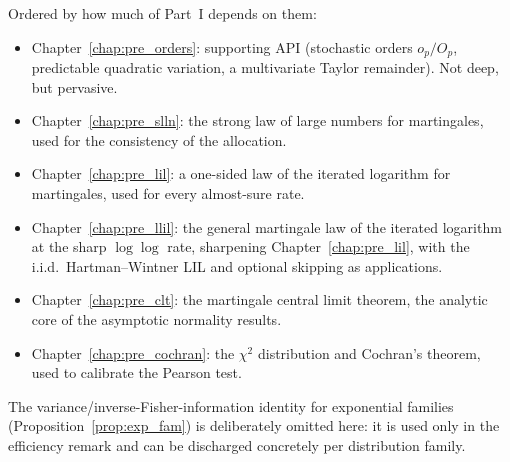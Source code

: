 Ordered by how much of Part~I depends on them:
\begin{itemize}
  \item Chapter~\ref{chap:pre_orders}: supporting API (stochastic orders
        $o_p/O_p$, predictable quadratic variation, a multivariate Taylor
        remainder). Not deep, but pervasive.
  \item Chapter~\ref{chap:pre_slln}: the strong law of large numbers for
        martingales, used for the consistency of the allocation.
  \item Chapter~\ref{chap:pre_lil}: a one-sided law of the iterated logarithm for
        martingales, used for every almost-sure rate.
  \item Chapter~\ref{chap:pre_llil}: the general martingale law of the iterated
        logarithm at the sharp $\log\log$ rate, sharpening
        Chapter~\ref{chap:pre_lil}, with the i.i.d.\ Hartman--Wintner LIL and
        optional skipping as applications.
  \item Chapter~\ref{chap:pre_clt}: the martingale central limit theorem, the
        analytic core of the asymptotic normality results.
  \item Chapter~\ref{chap:pre_cochran}: the $\chi^2$ distribution and Cochran's
        theorem, used to calibrate the Pearson test.
\end{itemize}
The variance/inverse-Fisher-information identity for exponential families
(Proposition~\ref{prop:exp_fam}) is deliberately omitted here: it is used only in
the efficiency remark and can be discharged concretely per distribution family.







